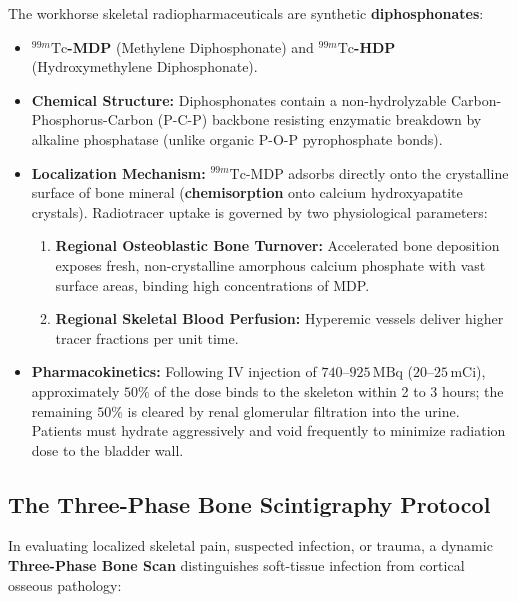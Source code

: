 \documentclass[11pt,a4paper]{article}
\begin{document}
The workhorse skeletal radiopharmaceuticals are synthetic \textbf{diphosphonates}:
\begin{itemize}[leftmargin=*]
    \item \textbf{$^{99m}\text{Tc}$-MDP} (Methylene Diphosphonate) and \textbf{$^{99m}\text{Tc}$-HDP} (Hydroxymethylene Diphosphonate).
    \item \textbf{Chemical Structure:} Diphosphonates contain a non-hydrolyzable Carbon-Phosphorus-Carbon ($\text{P-C-P}$) backbone resisting enzymatic breakdown by alkaline phosphatase (unlike organic $\text{P-O-P}$ pyrophosphate bonds).
    \item \textbf{Localization Mechanism:} $^{99m}\text{Tc}$-MDP adsorbs directly onto the crystalline surface of bone mineral (\textbf{chemisorption} onto calcium hydroxyapatite crystals). Radiotracer uptake is governed by two physiological parameters:
    \begin{enumerate}
        \item \textbf{Regional Osteoblastic Bone Turnover:} Accelerated bone deposition exposes fresh, non-crystalline amorphous calcium phosphate with vast surface areas, binding high concentrations of MDP.
        \item \textbf{Regional Skeletal Blood Perfusion:} Hyperemic vessels deliver higher tracer fractions per unit time.
    \end{enumerate}
    \item \textbf{Pharmacokinetics:} Following IV injection of $740\text{--}925\,\text{MBq}$ ($20\text{--}25\,\text{mCi}$), approximately $50\%$ of the dose binds to the skeleton within 2 to 3 hours; the remaining $50\%$ is cleared by renal glomerular filtration into the urine. Patients must hydrate aggressively and void frequently to minimize radiation dose to the bladder wall.
\end{itemize}

\subsection{The Three-Phase Bone Scintigraphy Protocol}

In evaluating localized skeletal pain, suspected infection, or trauma, a dynamic \textbf{Three-Phase Bone Scan} distinguishes soft-tissue infection from cortical osseous pathology:
\end{document}
